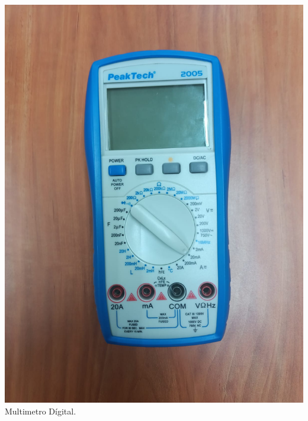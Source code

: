 \documentclass[10pt]{article}
\begin{document}
\begin{multicols}{2}
\begin{center}
	\includegraphics[scale = 0.1]{Imagenes/Material/MultiD.jpeg}\\
	Multimetro Dígital.\\

\end{center}
\end{multicols}
\end{document}
